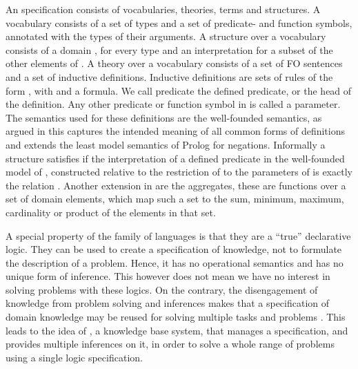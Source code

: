 \documentclass[runningheads]{llncs}
\newcommand{\logicname}[1]{\text{\sc #1}\xspace}
\newcommand{\idp}{\logicname{IDP}}
\newcommand{\fodotidp}{\logicname{FO(\ensuremath{\cdot})\ensuremath{^{\mathtt{IDP}}}}}
\newcommand{\fodot}{\logicname{FO(\ensuremath{\cdot})}}
\begin{document}
An \fodot specification consists of vocabularies, theories, terms and structures.
A vocabulary consists of a set of types and a set of predicate- and function symbols, annotated with the types of their arguments. 
A structure  over a vocabulary  consists of a domain , for every type  and an interpretation for a subset of the other elements of . 
A theory   over a vocabulary  consists of a set of FO sentences and a set of inductive definitions. 
Inductive definitions  are sets of rules of the form , with  and  a \fodotidp formula. 
We call predicate  the defined predicate, or the head of the definition. 
Any other predicate or function symbol in  is called a parameter. 
The semantics used for these definitions are the well-founded semantics, as argued in \cite{tocl/DeneckerT08} this captures the intended meaning of all common forms of definitions  and extends the least model semantics of Prolog for negations. Informally a structure  satisfies  if the interpretation of a defined predicate  in the well-founded model of , constructed relative to the restriction of  to the parameters of  is exactly the relation . 
Another extension in \fodotidp are the aggregates, these are functions over a set of domain elements, which map such a set to the sum, minimum, maximum, cardinality or product of the elements in that set.

A special property of the \fodot family of languages is that they are a ``true'' declarative logic. They can be used to create a specification of knowledge, not to formulate the description of a problem. Hence, it has no operational semantics and has no unique form of inference. This however does not mean we have no interest in solving problems with these logics. On the contrary, the disengagement of knowledge from problem solving and inferences makes that a specification of domain knowledge may be reused for solving multiple tasks and  problems \cite{iclp/DeneckerV08}. 
This leads to the idea of \idp, a knowledge base system, that manages a specification, and provides multiple inferences on it, in order to solve a whole range of problems using a single logic specification.
\end{document}
